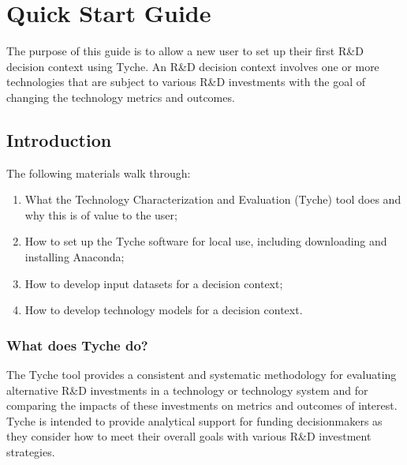 \documentclass[letterpaper,10pt,english]{sphinxmanual}
\begin{document}
\sphinxstepscope


\chapter{Quick Start Guide}
\label{\detokenize{cheat-sheet:quick-start-guide}}\label{\detokenize{cheat-sheet:sec-quickstart}}\label{\detokenize{cheat-sheet::doc}}
\sphinxAtStartPar
The purpose of this guide is to allow a new user to set up their first R\&D decision context using Tyche. An R\&D decision context involves one or more technologies that are subject to various R\&D investments with the goal of changing the technology metrics and outcomes.


\section{Introduction}
\label{\detokenize{cheat-sheet:introduction}}
\sphinxAtStartPar
The following materials walk through:
\begin{enumerate}
%
\item {} 
\sphinxAtStartPar
What the Technology Characterization and Evaluation (Tyche) tool does and why this is of value to the user;

\item {} 
\sphinxAtStartPar
How to set up the Tyche software for local use, including downloading and installing Anaconda;

\item {} 
\sphinxAtStartPar
How to develop input datasets for a decision context;

\item {} 
\sphinxAtStartPar
How to develop technology models for a decision context.

\end{enumerate}


\subsection{What does Tyche do?}
\label{\detokenize{cheat-sheet:what-does-tyche-do}}
\sphinxAtStartPar
The Tyche tool provides a consistent and systematic methodology for evaluating alternative R\&D investments in a technology or technology system and for comparing the impacts of these investments on metrics and outcomes of interest. Tyche is intended to provide analytical support for funding decision\sphinxhyphen{}makers as they consider how to meet their overall goals with various R\&D investment strategies.
\end{document}
